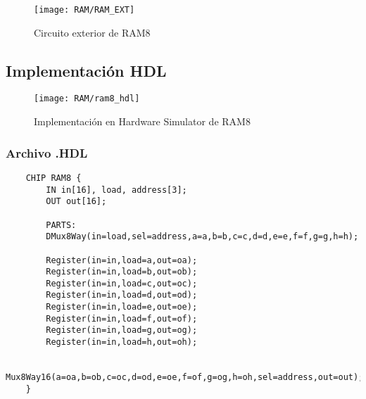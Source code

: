 \documentclass[12pt]{article}
\begin{document}
	\begin{figure}[H]
		\centering
		\texttt{[image: RAM/RAM\_EXT]}
		\caption{Circuito exterior de RAM8}
		\label{fig:ramext}
	\end{figure}


\subsection{Implementación HDL}
		\begin{figure}[H]
			\centering
			\texttt{[image: RAM/ram8\_hdl]}
			\caption{Implementación en Hardware Simulator de RAM8}
			\label{fig:ram8hdl}
		\end{figure}

		\subsubsection{Archivo .HDL}
			\begin{lstlisting}
	CHIP RAM8 {
		IN in[16], load, address[3];
		OUT out[16];

		PARTS:
		DMux8Way(in=load,sel=address,a=a,b=b,c=c,d=d,e=e,f=f,g=g,h=h);

		Register(in=in,load=a,out=oa);
		Register(in=in,load=b,out=ob);
		Register(in=in,load=c,out=oc);
		Register(in=in,load=d,out=od);
		Register(in=in,load=e,out=oe);
		Register(in=in,load=f,out=of);
		Register(in=in,load=g,out=og);
		Register(in=in,load=h,out=oh);

		Mux8Way16(a=oa,b=ob,c=oc,d=od,e=oe,f=of,g=og,h=oh,sel=address,out=out);
	}
			\end{lstlisting}


\newpage
\printbibliography[heading=bibintoc]
\end{document}
